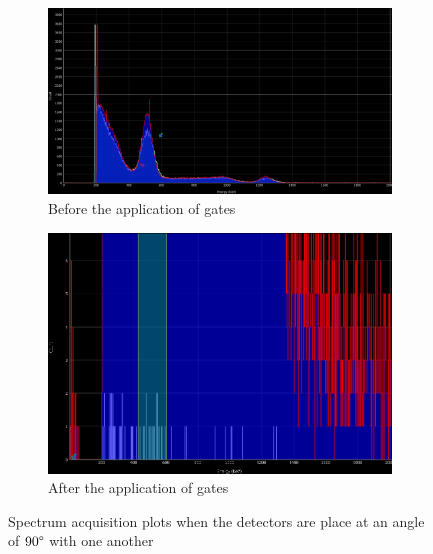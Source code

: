 \documentclass[%
 reprint,
nofootinbib,
 amsmath,amssymb,
 aps,
floatfix,
]{revtex4-2}
\begin{document}
    \begin{figure}
        \centering
        \begin{subfigure}[b]{0.5\textwidth}
            \centering
            \includegraphics[scale = 0.27]{Figures/spectrum_acquisition_90.png}
            \caption{Before the application of gates}
            \label{fig:90spec}
        \end{subfigure}
        \hfill
        \begin{subfigure}[b]{0.5\textwidth}
            \centering
            \includegraphics[scale = 0.35]{Figures/after_gate_90.png}
            \caption{After the application of gates}
            \label{fig:90gate}
        \end{subfigure}
            \caption{Spectrum acquisition plots when the detectors are place at an angle of $90 \degree$ with one another}
            \label{fig:90}
    \end{figure}
\end{document}
